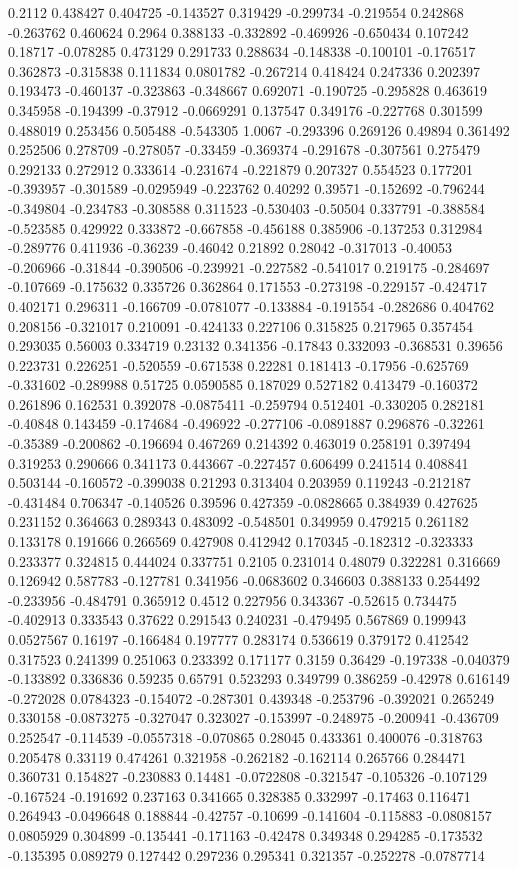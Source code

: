 0.2112 0.438427 0.404725 -0.143527 0.319429 -0.299734 -0.219554 0.242868 -0.263762 0.460624 0.2964 0.388133 -0.332892 -0.469926 -0.650434 0.107242 0.18717 -0.078285 0.473129 0.291733 0.288634 -0.148338 -0.100101 -0.176517 0.362873 -0.315838 0.111834 0.0801782 -0.267214 0.418424 0.247336 0.202397 0.193473 -0.460137 -0.323863 -0.348667 0.692071 -0.190725 -0.295828 0.463619 0.345958 -0.194399 -0.37912 -0.0669291 0.137547 0.349176 -0.227768 0.301599 0.488019 0.253456 0.505488 -0.543305 1.0067 -0.293396 0.269126 0.49894 0.361492 0.252506 0.278709 -0.278057 -0.33459 -0.369374 -0.291678 -0.307561 0.275479 0.292133 0.272912 0.333614 -0.231674 -0.221879 0.207327 0.554523 0.177201 -0.393957 -0.301589 -0.0295949 -0.223762 0.40292 0.39571 -0.152692 -0.796244 -0.349804 -0.234783 -0.308588 0.311523 -0.530403 -0.50504 0.337791 -0.388584 -0.523585 0.429922 0.333872 -0.667858 -0.456188 0.385906 -0.137253 0.312984 -0.289776 0.411936 -0.36239 -0.46042 0.21892 0.28042 -0.317013 -0.40053 -0.206966 -0.31844 -0.390506 -0.239921 -0.227582 -0.541017 0.219175 -0.284697 -0.107669 -0.175632 0.335726 0.362864 0.171553 -0.273198 -0.229157 -0.424717 0.402171 0.296311 -0.166709 -0.0781077 -0.133884 -0.191554 -0.282686 0.404762 0.208156 -0.321017 0.210091 -0.424133 0.227106 0.315825 0.217965 0.357454 0.293035 0.56003 0.334719 0.23132 0.341356 -0.17843 0.332093 -0.368531 0.39656 0.223731 0.226251 -0.520559 -0.671538 0.22281 0.181413 -0.17956 -0.625769 -0.331602 -0.289988 0.51725 0.0590585 0.187029 0.527182 0.413479 -0.160372 0.261896 0.162531 0.392078 -0.0875411 -0.259794 0.512401 -0.330205 0.282181 -0.40848 0.143459 -0.174684 -0.496922 -0.277106 -0.0891887 0.296876 -0.32261 -0.35389 -0.200862 -0.196694 0.467269 0.214392 0.463019 0.258191 0.397494 0.319253 0.290666 0.341173 0.443667 -0.227457 0.606499 0.241514 0.408841 0.503144 -0.160572 -0.399038 0.21293 0.313404 0.203959 0.119243 -0.212187 -0.431484 0.706347 -0.140526 0.39596 0.427359 -0.0828665 0.384939 0.427625 0.231152 0.364663 0.289343 0.483092 -0.548501 0.349959 0.479215 0.261182 0.133178 0.191666 0.266569 0.427908 0.412942 0.170345 -0.182312 -0.323333 0.233377 0.324815 0.444024 0.337751 0.2105 0.231014 0.48079 0.322281 0.316669 0.126942 0.587783 -0.127781 0.341956 -0.0683602 0.346603 0.388133 0.254492 -0.233956 -0.484791 0.365912 0.4512 0.227956 0.343367 -0.52615 0.734475 -0.402913 0.333543 0.37622 0.291543 0.240231 -0.479495 0.567869 0.199943 0.0527567 0.16197 -0.166484 0.197777 0.283174 0.536619 0.379172 0.412542 0.317523 0.241399 0.251063 0.233392 0.171177 0.3159 0.36429 -0.197338 -0.040379 -0.133892 0.336836 0.59235 0.65791 0.523293 0.349799 0.386259 -0.42978 0.616149 -0.272028 0.0784323 -0.154072 -0.287301 0.439348 -0.253796 -0.392021 0.265249 0.330158 -0.0873275 -0.327047 0.323027 -0.153997 -0.248975 -0.200941 -0.436709 0.252547 -0.114539 -0.0557318 -0.070865 0.28045 0.433361 0.400076 -0.318763 0.205478 0.33119 0.474261 0.321958 -0.262182 -0.162114 0.265766 0.284471 0.360731 0.154827 -0.230883 0.14481 -0.0722808 -0.321547 -0.105326 -0.107129 -0.167524 -0.191692 0.237163 0.341665 0.328385 0.332997 -0.17463 0.116471 0.264943 -0.0496648 0.188844 -0.42757 -0.10699 -0.141604 -0.115883 -0.0808157 0.0805929 0.304899 -0.135441 -0.171163 -0.42478 0.349348 0.294285 -0.173532 -0.135395 0.089279 0.127442 0.297236 0.295341 0.321357 -0.252278 -0.0787714 